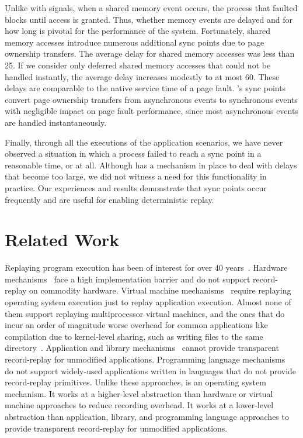 Unlike with signals, when a shared memory event occurs, the process
that faulted blocks until access is granted. Thus, whether memory
events are delayed and for how long is pivotal for the performance of
the system. Fortunately, shared memory accesses introduce numerous
additional sync points due to page ownership transfers. The average
delay for shared memory accesses was less than 25\us{}. If we consider
only deferred shared memory accesses that could not be handled
instantly, the average delay increases modestly to at most 60\us{}.
These delays are comparable to the native service time of a page
fault. \scribe{}'s sync points convert page ownership transfers from
asynchronous events to synchronous events with negligible impact on
page fault performance, since most asynchronous events are handled
instantaneously.

Finally, through all the executions of the application scenarios,
we have never observed a situation in which a process failed to reach a sync
point in a reasonable time, or at all.  Although \scribe{} has a 
mechanism in place to deal with delays that become too large, we did
not witness a need for this functionality in practice.  
Our experiences and results demonstrate that sync points occur
frequently and are useful for enabling deterministic replay.

\section{Related Work}
\label{scribe:sec:related}

Replaying program execution has been of interest for over 40
years~\cite{exdams}.  Hardware
mechanisms~\cite{hwrr,dmp,rerun,delorean,capo,strata,bugnet,fdr}
face a high implementation barrier and do not support record-replay on
commodity hardware.  Virtual machine
mechanisms~\cite{bressoud,revirt,smp-revirt,vmware}
require replaying operating system execution just to replay
application execution.  Almost none of them support replaying
multiprocessor virtual machines, and the ones that do incur an order
of magnitude worse overhead for common applications like
compilation due to kernel-level sharing, such as writing files to the
same directory~\cite{smp-revirt}.  Application and 
library mechanisms~\cite{liblog,r2:osdi,kendo,jockey} cannot provide
transparent record-replay for unmodified applications.  Programming
language mechanisms~\cite{dejavu,instant-replay,replay-pldi} do not
support widely-used applications written in languages that do not
provide record-replay primitives.  Unlike these approaches, \scribe{}
is an operating system mechanism.  It works at a higher-level
abstraction than hardware or virtual machine approaches to reduce
recording overhead.  It works at a lower-level abstraction than
application, library, and programming language approaches to provide
transparent record-replay for unmodified applications.

